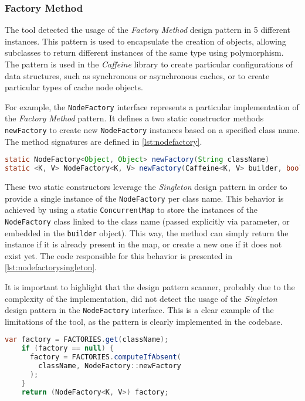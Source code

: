 \subsubsection{Factory Method}
\label{par:nodefactory}

The tool detected the usage of the \textit{Factory Method} design pattern in 5 different instances. This pattern is used to encapsulate the creation of objects, allowing subclasses to return different instances of the same type using polymorphism. The pattern is used in the \textit{Caffeine} library to create particular configurations of data structures, such as synchronous or asynchronous caches, or to create particular types of cache node objects.

For example, the \texttt{NodeFactory} interface represents a particular implementation of the \textit{Factory Method} pattern. It defines a two static constructor methods \texttt{newFactory} to create new \texttt{NodeFactory} instances based on a specified class name. The method signatures are defined in \autoref{lst:nodefactory}.

\begin{lstlisting}[language=Java, caption={\texttt{NodeFactory} interface static constructor methods}, captionpos=b, label={lst:nodefactory}]
static NodeFactory<Object, Object> newFactory(String className)
static <K, V> NodeFactory<K, V> newFactory(Caffeine<K, V> builder, boolean isAsync)
\end{lstlisting}

\noindent These two static constructors leverage the \textit{Singleton} design pattern in order to provide a single instance of the \texttt{NodeFactory} per class name. This behavior is achieved by using a static \texttt{ConcurrentMap} to store the instances of the \texttt{NodeFactory} class linked to the class name (passed explicitly via parameter, or embedded in the \texttt{builder} object). This way, the method can simply return the instance if it is already present in the map, or create a new one if it does not exist yet. The code responsible for this behavior is presented in \autoref{lst:nodefactorysingleton}.

It is important to highlight that the design pattern scanner, probably due to the complexity of the implementation, did not detect the usage of the \textit{Singleton} design pattern in the \texttt{NodeFactory} interface. This is a clear example of the limitations of the tool, as the pattern is clearly implemented in the codebase.

\begin{lstlisting}[language=Java, caption={\texttt{NodeFactory} \textit{Singleton} design pattern implementation using a static \texttt{ConcurrentMap} instance}, captionpos=b, label={lst:nodefactorysingleton}]
    var factory = FACTORIES.get(className);
    if (factory == null) {
      factory = FACTORIES.computeIfAbsent(
        className, NodeFactory::newFactory
      );
    }
    return (NodeFactory<K, V>) factory;
\end{lstlisting}

